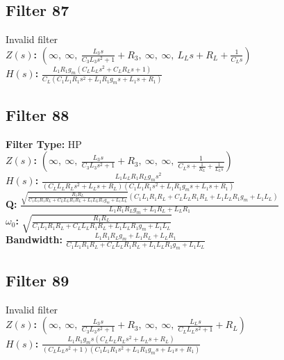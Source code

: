 \documentclass{article}
\begin{document}
\subsection*{Filter 87}
Invalid filter \\ 
\textbf{$Z(s)$:} $\left( \infty, \  \infty, \  \frac{L_{3} s}{C_{3} L_{3} s^{2} + 1} + R_{3}, \  \infty, \  \infty, \  L_{L} s + R_{L} + \frac{1}{C_{L} s}\right)$ \\ 
\textbf{$H(s)$:} $\frac{L_{1} R_{1} g_{m} \left(C_{L} L_{L} s^{2} + C_{L} R_{L} s + 1\right)}{C_{L} \left(C_{1} L_{1} R_{1} s^{2} + L_{1} R_{1} g_{m} s + L_{1} s + R_{1}\right)}$ \\ 
\subsection*{Filter 88}
\textbf{Filter Type:} HP \\ 
\textbf{$Z(s)$:} $\left( \infty, \  \infty, \  \frac{L_{3} s}{C_{3} L_{3} s^{2} + 1} + R_{3}, \  \infty, \  \infty, \  \frac{1}{C_{L} s + \frac{1}{R_{L}} + \frac{1}{L_{L} s}}\right)$ \\ 
\textbf{$H(s)$:} $\frac{L_{1} L_{L} R_{1} R_{L} g_{m} s^{2}}{\left(C_{L} L_{L} R_{L} s^{2} + L_{L} s + R_{L}\right) \left(C_{1} L_{1} R_{1} s^{2} + L_{1} R_{1} g_{m} s + L_{1} s + R_{1}\right)}$ \\ 
\textbf{Q:} $\frac{\sqrt{\frac{R_{1} R_{L}}{C_{1} L_{1} R_{1} R_{L} + C_{L} L_{L} R_{1} R_{L} + L_{1} L_{L} R_{1} g_{m} + L_{1} L_{L}}} \left(C_{1} L_{1} R_{1} R_{L} + C_{L} L_{L} R_{1} R_{L} + L_{1} L_{L} R_{1} g_{m} + L_{1} L_{L}\right)}{L_{1} R_{1} R_{L} g_{m} + L_{1} R_{L} + L_{L} R_{1}}$ \\ 
\textbf{$\omega_0$:} $\sqrt{\frac{R_{1} R_{L}}{C_{1} L_{1} R_{1} R_{L} + C_{L} L_{L} R_{1} R_{L} + L_{1} L_{L} R_{1} g_{m} + L_{1} L_{L}}}$ \\ 
\textbf{Bandwidth:} $\frac{L_{1} R_{1} R_{L} g_{m} + L_{1} R_{L} + L_{L} R_{1}}{C_{1} L_{1} R_{1} R_{L} + C_{L} L_{L} R_{1} R_{L} + L_{1} L_{L} R_{1} g_{m} + L_{1} L_{L}}$ \\ 
\subsection*{Filter 89}
Invalid filter \\ 
\textbf{$Z(s)$:} $\left( \infty, \  \infty, \  \frac{L_{3} s}{C_{3} L_{3} s^{2} + 1} + R_{3}, \  \infty, \  \infty, \  \frac{L_{L} s}{C_{L} L_{L} s^{2} + 1} + R_{L}\right)$ \\ 
\textbf{$H(s)$:} $\frac{L_{1} R_{1} g_{m} s \left(C_{L} L_{L} R_{L} s^{2} + L_{L} s + R_{L}\right)}{\left(C_{L} L_{L} s^{2} + 1\right) \left(C_{1} L_{1} R_{1} s^{2} + L_{1} R_{1} g_{m} s + L_{1} s + R_{1}\right)}$ \\ 
\end{document}
